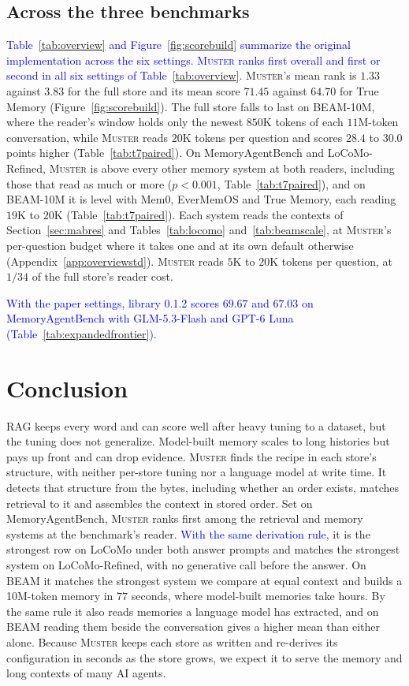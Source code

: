 \documentclass{article}
\newcommand{\nativechange}[1]{\textcolor{blue}{#1}}
\newcommand{\sys}{\textsc{Muster}}
\begin{document}
\subsection{Across the three benchmarks}\label{sec:across}

\nativechange{Table~\ref{tab:overview} and Figure~\ref{fig:scorebuild} summarize the original implementation across the six settings. \sys{} ranks first overall and first or second in all six settings of Table~\ref{tab:overview}.} \sys{}'s mean rank is $1.33$ against $3.83$ for the full store and its mean score $71.45$ against $64.70$ for True Memory (Figure~\ref{fig:scorebuild}). The full store falls to last on BEAM-10M, where the reader's window holds only the newest $850$K tokens of each $11$M-token conversation, while \sys{} reads $20$K tokens per question and scores $28.4$ to $30.0$ points higher (Table~\ref{tab:t7paired}). On MemoryAgentBench and LoCoMo-Refined, \sys{} is above every other memory system at both readers, including those that read as much or more ($p<0.001$, Table~\ref{tab:t7paired}), and on BEAM-10M it is level with Mem0, EverMemOS and True Memory, each reading $19$K to $20$K (Table~\ref{tab:t7paired}). Each system reads the contexts of Section~\ref{sec:mabres} and Tables~\ref{tab:locomo} and~\ref{tab:beamscale}, at \sys{}'s per-question budget where it takes one and at its own default otherwise (Appendix~\ref{app:overviewstd}). \sys{} reads $5$K to $20$K tokens per question, at $1/34$ of the full store's reader cost.

\nativechange{With the paper settings, library 0.1.2 scores $69.67$ and $67.03$ on MemoryAgentBench with GLM-5.3-Flash and GPT-6 Luna (Table~\ref{tab:expandedfrontier}).}

\FloatBarrier
\section{Conclusion}

RAG keeps every word and can score well after heavy tuning to a dataset, but the tuning does not generalize. Model-built memory scales to long histories but pays up front and can drop evidence. \sys{} finds the recipe in each store's structure, with neither per-store tuning nor a language model at write time. It detects that structure from the bytes, including whether an order exists, matches retrieval to it and assembles the context in stored order. Set on MemoryAgentBench, \sys{} ranks first among the retrieval and memory systems at the benchmark's reader. \nativechange{With the same derivation rule,} it is the strongest row on LoCoMo under both answer prompts and matches the strongest system on LoCoMo-Refined, with no generative call before the answer. On BEAM it matches the strongest system we compare at equal context and builds a 10M-token memory in $77$ seconds, where model-built memories take hours. By the same rule it also reads memories a language model has extracted, and on BEAM reading them beside the conversation gives a higher mean than either alone. Because \sys{} keeps each store as written and re-derives its configuration in seconds as the store grows, we expect it to serve the memory and long contexts of many AI agents.
\end{document}

